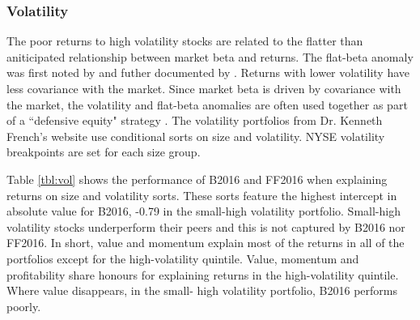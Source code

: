 
\subsubsection{Volatility}




The poor returns to high volatility stocks are related to the flatter than aniticipated
relationship between market beta and returns. The flat-beta anomaly was first noted by
\textcite{jensen1972capital} and futher documented by \textcite{fama1973risk}. Returns
with lower volatility have less covariance with the market. Since market beta is driven by
covariance with the market, the volatility and flat-beta anomalies are often used together
as part of a ``defensive equity" strategy \parencite{frazzini2014betting}. The volatility
portfolios from Dr. Kenneth French's website use conditional sorts on size and volatility.
NYSE volatility breakpoints are set for each size group.

Table \ref{tbl:vol} shows the performance of B2016 and FF2016 when explaining
returns on size and volatility sorts. These sorts feature the highest intercept in
absolute value for B2016, -0.79 in the small-high volatility portfolio. Small-high
volatility stocks underperform their peers and this is not captured by B2016 nor FF2016.
In short, value and momentum explain most of the returns in all of the portfolios except
for the high-volatility quintile. Value, momentum and profitability share honours for
explaining returns in the high-volatility quintile. Where value disappears, in the small-
high volatility portfolio, B2016 performs poorly.

